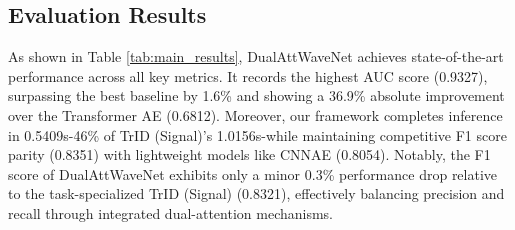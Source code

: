 \documentclass[conference]{IEEEtran}
\begin{document}
\subsection{Evaluation Results}

As shown in Table \ref{tab:main_results}, DualAttWaveNet achieves state-of-the-art performance across all key metrics. It records the highest AUC score (0.9327), surpassing the best baseline by 1.6\% and showing a 36.9\% absolute improvement over the Transformer AE (0.6812). Moreover, our framework completes inference in 0.5409s-46\% of TrID (Signal)'s 1.0156s-while maintaining competitive F1 score parity (0.8351) with lightweight models like CNNAE (0.8054). Notably, the F1 score of DualAttWaveNet exhibits only a minor 0.3\% performance drop relative to the task-specialized TrID (Signal) (0.8321), effectively balancing precision and recall through integrated dual-attention mechanisms.


\begin{table}[tbp]
    \caption{Performance Comparison of DualAttWaveNet Against Baseline Models}
    \label{tab:main_results}
    \centering
\end{table}
\end{document}
